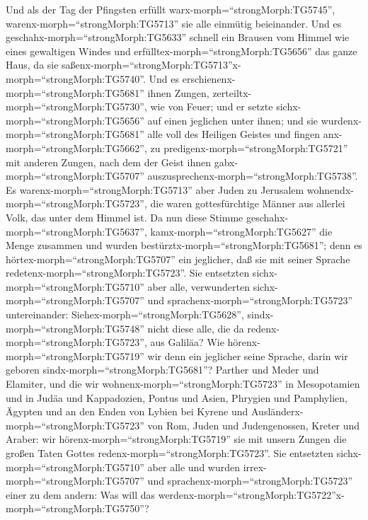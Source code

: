  Und als der Tag der Pfingsten erfüllt
warx-morph=``strongMorph:TG5745'', warenx-morph=``strongMorph:TG5713''
sie alle einmütig beieinander.  Und es
geschahx-morph=``strongMorph:TG5633'' schnell ein Brausen vom Himmel wie
eines gewaltigen Windes und erfülltex-morph=``strongMorph:TG5656'' das
ganze Haus, da sie
saßenx-morph=``strongMorph:TG5713''x-morph=``strongMorph:TG5740''.
 Und es erschienenx-morph=``strongMorph:TG5681'' ihnen
Zungen, zerteiltx-morph=``strongMorph:TG5730'', wie von Feuer; und er
setzte sichx-morph=``strongMorph:TG5656'' auf einen jeglichen unter
ihnen;  und sie wurdenx-morph=``strongMorph:TG5681'' alle
voll des Heiligen Geistes und fingen anx-morph=``strongMorph:TG5662'',
zu predigenx-morph=``strongMorph:TG5721'' mit anderen Zungen, nach dem
der Geist ihnen gabx-morph=``strongMorph:TG5707''
auszusprechenx-morph=``strongMorph:TG5738''.  Es
warenx-morph=``strongMorph:TG5713'' aber Juden zu Jerusalem
wohnendx-morph=``strongMorph:TG5723'', die waren gottesfürchtige Männer
aus allerlei Volk, das unter dem Himmel ist.  Da nun diese
Stimme geschahx-morph=``strongMorph:TG5637'',
kamx-morph=``strongMorph:TG5627'' die Menge zusammen und wurden
bestürztx-morph=``strongMorph:TG5681''; denn es
hörtex-morph=``strongMorph:TG5707'' ein jeglicher, daß sie mit seiner
Sprache redetenx-morph=``strongMorph:TG5723''.  Sie
entsetzten sichx-morph=``strongMorph:TG5710'' aber alle, verwunderten
sichx-morph=``strongMorph:TG5707'' und
sprachenx-morph=``strongMorph:TG5723'' untereinander:
Siehex-morph=``strongMorph:TG5628'', sindx-morph=``strongMorph:TG5748''
nicht diese alle, die da redenx-morph=``strongMorph:TG5723'', aus
Galiläa?  Wie hörenx-morph=``strongMorph:TG5719'' wir denn
ein jeglicher seine Sprache, darin wir geboren
sindx-morph=``strongMorph:TG5681''?  Parther und Meder und
Elamiter, und die wir wohnenx-morph=``strongMorph:TG5723'' in
Mesopotamien und in Judäa und Kappadozien, Pontus und Asien,
 Phrygien und Pamphylien, Ägypten und an den Enden von
Lybien bei Kyrene und Ausländerx-morph=``strongMorph:TG5723'' von Rom,
 Juden und Judengenossen, Kreter und Araber: wir
hörenx-morph=``strongMorph:TG5719'' sie mit unsern Zungen die großen
Taten Gottes redenx-morph=``strongMorph:TG5723''.  Sie
entsetzten sichx-morph=``strongMorph:TG5710'' aber alle und wurden
irrex-morph=``strongMorph:TG5707'' und
sprachenx-morph=``strongMorph:TG5723'' einer zu dem andern: Was will das
werdenx-morph=``strongMorph:TG5722''x-morph=``strongMorph:TG5750''?
